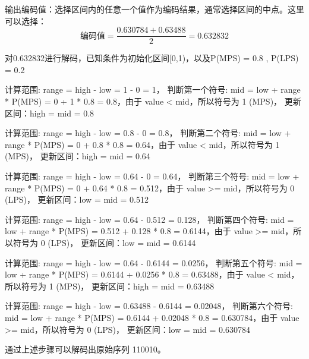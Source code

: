 \documentclass{/Users/hi/Study/template/code}
\begin{document}
\begin{tcolorbox}
\begin{serialNumber}
		\item 输出编码值：选择区间内的任意一个值作为编码结果，通常选择区间的中点。这里可以选择：
		\begin{equation}
			\text{编码值} = \frac{0.630784 + 0.63488}{2} = 0.632832
		\end{equation}
	\end{serialNumber}


\end{tcolorbox}

\begin{tcolorbox}
	\small
	对0.632832进行解码，已知条件为初始化区间[0,1)，以及P(MPS) = 0.8 , P(LPS) = 0.2
	\begin{serialNumber}
		\item 计算范围: range = high - low = 1 - 0 = 1，
		判断第一个符号: mid = low + range * P(MPS) = 0 + 1 * 0.8 = 0.8，由于 value < mid，所以符号为 1 (MPS)，
		更新区间：high = mid = 0.8

		\item 计算范围: range = high - low = 0.8 - 0 = 0.8，
		判断第二个符号: mid = low + range * P(MPS) = 0 + 0.8 * 0.8 = 0.64，由于 value < mid，所以符号为 1 (MPS)，
		更新区间：high = mid = 0.64
		\item 计算范围: range = high - low = 0.64 - 0 = 0.64，
		判断第三个符号: mid = low + range * P(MPS) = 0 + 0.64 * 0.8 = 0.512，由于 value >= mid，所以符号为 0 (LPS)，
		更新区间：low = mid = 0.512

		\item 计算范围: range = high - low = 0.64 - 0.512 = 0.128，
		判断第四个符号: mid = low + range * P(MPS) = 0.512 + 0.128 * 0.8 = 0.6144，由于 value >= mid，所以符号为 0 (LPS)，
		更新区间：low = mid = 0.6144

		\item 计算范围: range = high - low = 0.64 - 0.6144 = 0.0256，
		判断第五个符号: mid = low + range * P(MPS) = 0.6144 + 0.0256 * 0.8 = 0.63488，由于 value < mid，所以符号为 1 (MPS)，
		更新区间：high = mid = 0.63488

		\item 计算范围: range = high - low = 0.63488 - 0.6144 = 0.02048，
		判断第六个符号: mid = low + range * P(MPS) = 0.6144 + 0.02048 * 0.8 = 0.630784，由于 value >= mid，所以符号为 0 (LPS)，
		更新区间：low = mid = 0.630784
	\end{serialNumber}

	通过上述步骤可以解码出原始序列 110010。
\end{tcolorbox}


\newpage
\end{document}

